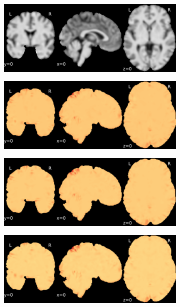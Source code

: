 \documentclass{article}
\begin{document}
\begin{appendices}
\begin{landscape}
\begin{figure}
            \begin{subfigure}[t]{0.2\paperheight}
                \centering
                \includegraphics[width=\textwidth]{figures/sig/5mm/ieee_ds002338_sub-xp207.pdf}
            \end{subfigure}
            \begin{subfigure}[t]{0.2\paperheight}
                \centering
                \includegraphics[width=\textwidth]{figures/sig/5mm/rr_ds002338_sub-xp207_sig.pdf}
            \end{subfigure}
            \begin{subfigure}[t]{0.2\paperheight}
                \centering
                \includegraphics[width=\textwidth]{figures/sig/5mm/rs_ds002338_sub-xp207_sig.pdf}
            \end{subfigure}
            \begin{subfigure}[t]{0.2\paperheight}
                \centering
                \includegraphics[width=\textwidth]{figures/sig/5mm/rr.rs_ds002338_sub-xp207_sig.pdf}

\end{subfigure}
\end{figure}
\end{landscape}
\end{appendices}
\end{document}

